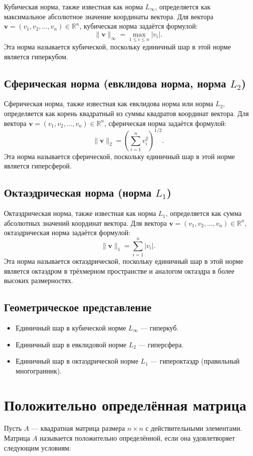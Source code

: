 \documentclass{article}
\begin{document}
Кубическая норма, также известная как норма $L_\infty$, определяется как максимальное абсолютное значение координаты вектора. Для вектора $\mathbf{v} = (v_1, v_2, \ldots, v_n) \in \mathbb{R}^n$, кубическая норма задаётся формулой:
\[
\|\mathbf{v}\|_\infty = \max_{1 \leq i \leq n} |v_i|.
\]
Эта норма называется кубической, поскольку единичный шар в этой норме является гиперкубом.

\subsection{Сферическая норма (евклидова норма, норма $L_2$)}

Сферическая норма, также известная как евклидова норма или норма $L_2$, определяется как корень квадратный из суммы квадратов координат вектора. Для вектора $\mathbf{v} = (v_1, v_2, \ldots, v_n) \in \mathbb{R}^n$, сферическая норма задаётся формулой:
\[
\|\mathbf{v}\|_2 = \left( \sum_{i=1}^n v_i^2 \right)^{1/2}.
\]
Эта норма называется сферической, поскольку единичный шар в этой норме является гиперсферой.

\subsection{Октаэдрическая норма (норма $L_1$)}

Октаэдрическая норма, также известная как норма $L_1$, определяется как сумма абсолютных значений координат вектора. Для вектора $\mathbf{v} = (v_1, v_2, \ldots, v_n) \in \mathbb{R}^n$, октаэдрическая норма задаётся формулой:
\[
\|\mathbf{v}\|_1 = \sum_{i=1}^n |v_i|.
\]
Эта норма называется октаэдрической, поскольку единичный шар в этой норме является октаэдром в трёхмерном пространстве и аналогом октаэдра в более высоких размерностях.

\subsection{Геометрическое представление}

\begin{itemize}
    \item Единичный шар в кубической норме $L_\infty$ — гиперкуб.
    \item Единичный шар в евклидовой норме $L_2$ — гиперсфера.
    \item Единичный шар в октаэдрической норме $L_1$ — гипероктаэдр (правильный многогранник).
\end{itemize}
\section{Положительно определённая матрица}
Пусть $A$ — квадратная матрица размера $n \times n$ с действительными элементами. Матрица $A$ называется положительно определённой, если она удовлетворяет следующим условиям:
\end{document}
